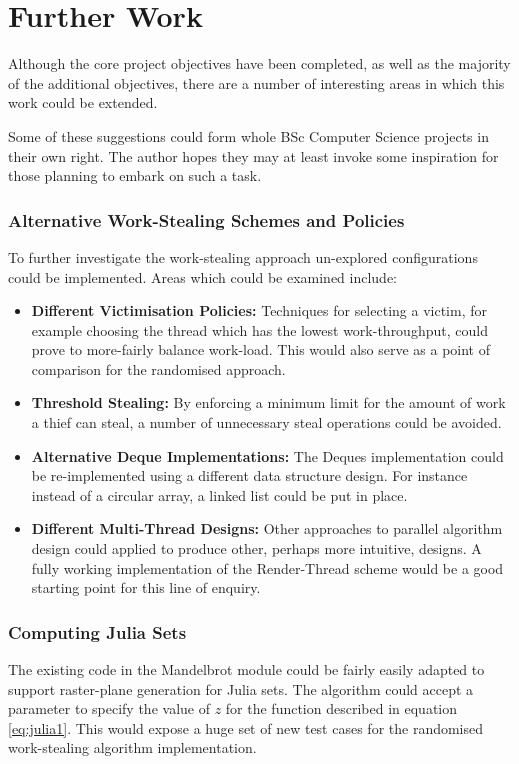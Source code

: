 \section{Further Work}

Although the core project objectives have been completed, as well as the majority of the additional objectives, 
there are a number of interesting areas in which this work could be extended.

Some of these suggestions could form whole BSc Computer Science projects in their own right. The author hopes they 
may at least invoke some inspiration for those planning to embark on such a task.

\subsubsection*{Alternative Work-Stealing Schemes and Policies}
To further investigate the work-stealing approach un-explored configurations could be implemented. 
Areas which could be examined include:
\begin{itemize}
\item \textbf{Different Victimisation Policies: } 
    Techniques for selecting a victim, for example choosing the thread which has the lowest work-throughput, could 
    prove to more-fairly balance work-load. This would also serve as a point of comparison for the randomised approach.
\item \textbf{Threshold Stealing: }
    By enforcing a minimum limit for the amount of work a thief can steal, a number of unnecessary steal operations could be avoided.
\item \textbf{Alternative Deque Implementations: }
    The Deques implementation could be re-implemented using a different data structure design. For instance instead of a circular array,
    a linked list could be put in place.
\item \textbf{Different Multi-Thread Designs: }
    Other approaches to parallel algorithm design could applied to produce other, perhaps more intuitive, designs.
    A fully working implementation of the Render-Thread scheme would be a good starting point for this line of enquiry.
\end{itemize}

\subsubsection*{Computing Julia Sets}
The existing code in the Mandelbrot module could be fairly easily adapted to support raster-plane generation for Julia sets.
The algorithm could accept a parameter to specify the value of \(z\) for the function described in equation \ref{eq:julia1}.
This would expose a huge set of new test cases for the randomised work-stealing algorithm implementation.

